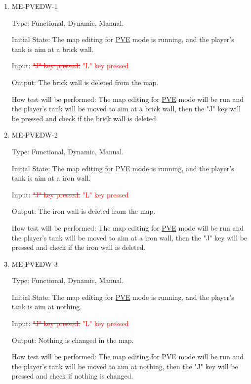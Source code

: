 \documentclass[12pt, titlepage]{article}
\begin{document}
\begin{enumerate}

\item{ME-PVEDW-1\\}

Type: Functional, Dynamic, Manual.
					
Initial State: The map editing for \underline{PVE} mode is running, and the player's tank is aim at a brick wall.
					
Input: \textcolor{red}{\sout{"J" key pressed.}} \textcolor{red}{"L" key pressed}
					
Output: The brick wall is deleted from the map.
					
How test will be performed: The map editing for \underline{PVE} mode will be run and the player's tank will be moved to aim at a brick wall, then the "J" key will be pressed and check if the brick wall is deleted.

\item{ME-PVEDW-2\\}

Type: Functional, Dynamic, Manual.
					
Initial State: The map editing for \underline{PVE} mode is running, and the player's tank is aim at a iron wall.
					
Input: \textcolor{red}{\sout{"J" key pressed.}} \textcolor{red}{"L" key pressed}
					
Output: The iron wall is deleted from the map.
					
How test will be performed: The map editing for \underline{PVE} mode will be run and the player's tank will be moved to aim at a iron wall, then the "J" key will be pressed and check if the iron wall is deleted.

\item{ME-PVEDW-3\\}

Type: Functional, Dynamic, Manual.
					
Initial State: The map editing for \underline{PVE} mode is running, and the player's tank is aim at nothing.
					
Input: \textcolor{red}{\sout{"J" key pressed.}} \textcolor{red}{"L" key pressed}
					
Output: Nothing is changed in the map.
					
How test will be performed: The map editing for \underline{PVE} mode will be run and the player's tank will be moved to aim at nothing, then the "J" key will be pressed and check if nothing is changed.

\end{enumerate}
\end{document}
